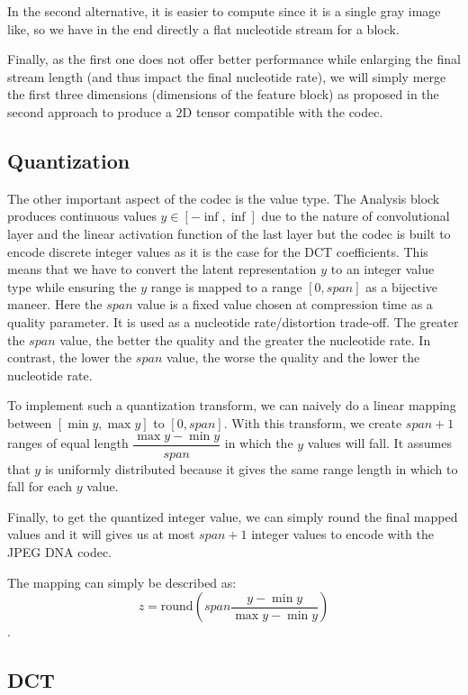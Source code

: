 In the second alternative, it is easier to compute since it is a single gray image like, so we have in the end directly a flat nucleotide stream for a block. 

Finally, as the first one does not offer better performance while enlarging the final stream length (and thus impact the final nucleotide rate), we will simply merge the first three dimensions (dimensions of the feature block) as proposed in the second approach to produce a $2$D tensor compatible with the codec.

\subsection{Quantization}
\label{subsec:quantization}

The other important aspect of the codec is the value type. The Analysis block produces continuous values $y \in [-\inf, \inf]$ due to the nature of convolutional layer and the linear activation function of the last layer but the codec is built to encode discrete integer values as it is the case for the DCT coefficients. This means that we have to convert the latent representation $y$ to an integer value type while ensuring the $y$ range is mapped to a range $[0, span]$ as a bijective maneer. Here the $span$ value is a fixed value chosen at compression time as a quality parameter. It is used as a nucleotide rate/distortion trade-off. The greater the $span$ value, the better the quality and the greater the nucleotide rate. 
In contrast, the lower the $span$ value, the worse the quality and the lower the nucleotide rate.

To implement such a quantization transform, we can naively do a linear mapping between $[\min{y}, \max{y}]$ to $[0, span]$. With this transform, we create $span+1$ ranges of equal length $\dfrac{\max{y} - \min{y}}{span}$ in which the $y$ values will fall. 
It assumes that $y$ is uniformly distributed because it gives the same range length in which to fall for each $y$ value.

Finally, to get the quantized integer value, we can simply round the final mapped values and it will gives us at most $span+1$ integer values to encode with the JPEG DNA codec.

The mapping can simply be described as: 
$$z = \text{round} \left(span \frac{y - \min{y}}{\max{y} - \min{y}}\right)$$.

\subsection{DCT}

